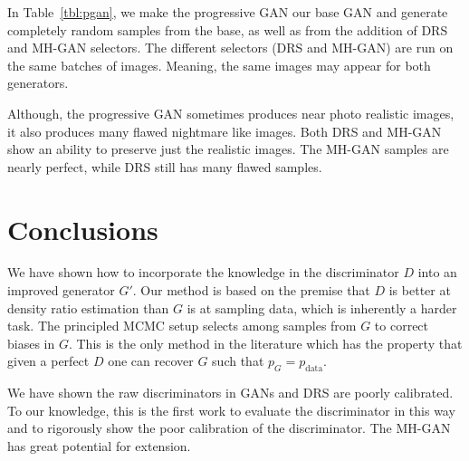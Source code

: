 \documentclass{article}
\newcommand{\PG}{{p_G}}
\newcommand{\PR}{{p_{\textrm{data}}}}
\begin{document}
In Table~\ref{tbl:pgan}, we make the progressive GAN our base GAN and generate completely random samples from the base, as well as from the addition of DRS and MH-GAN selectors.
The different selectors (DRS and MH-GAN) are run on the same batches of images.
Meaning, the same images may appear for both generators.

Although, the progressive GAN sometimes produces near photo realistic images, it also produces many flawed nightmare like images.
Both DRS and MH-GAN show an ability to preserve just the realistic images.
The MH-GAN samples are nearly perfect, while DRS still has many flawed samples.

\section{Conclusions}
\label{sec:conclusions}

We have shown how to incorporate the knowledge in the discriminator $D$ into an improved generator $G'$.
Our method is based on the premise that $D$ is better at density ratio estimation than $G$ is at sampling data, which is inherently a harder task.
The principled MCMC setup selects among samples from $G$ to correct biases in $G$.
This is the only method in the literature which has the property that given a perfect $D$ one can recover $G$ such that $\PG = \PR$.

We have shown the raw discriminators in GANs and DRS are poorly calibrated.
To our knowledge, this is the first work to evaluate the discriminator in this way and to rigorously show the poor calibration of the discriminator.
The MH-GAN has great potential for extension.

\fboxsep=1.5pt  %
\newcommand{\unreal}[1]{\fcolorbox{white}{red}{#1}}
\end{document}
